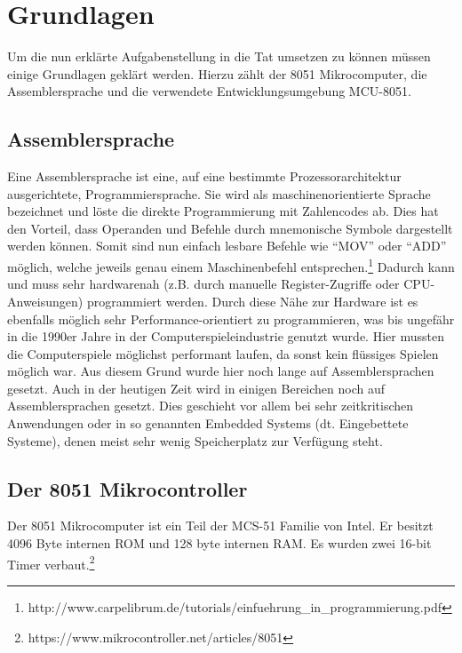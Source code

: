 \documentclass[11pt,ngerman]{report}
\begin{document}
\chapter{Grundlagen}

Um die nun erklärte Aufgabenstellung in die Tat umsetzen zu können müssen einige Grundlagen geklärt werden. Hierzu zählt der 8051 Mikrocomputer, die Assemblersprache und die verwendete Entwicklungsumgebung MCU-8051.

\section{Assemblersprache}

Eine Assemblersprache ist eine, auf eine bestimmte Prozessorarchitektur ausgerichtete, Programmiersprache. Sie wird als maschinenorientierte Sprache bezeichnet und löste die direkte Programmierung mit Zahlencodes ab. Dies hat den Vorteil, dass Operanden und Befehle durch mnemonische Symbole dargestellt werden können. Somit sind nun einfach lesbare Befehle wie “MOV” oder “ADD” möglich, welche jeweils genau einem Maschinenbefehl entsprechen.\footnote{http://www.carpelibrum.de/tutorials/einfuehrung\_in\_programmierung.pdf}
Dadurch kann und muss sehr hardwarenah (z.B. durch manuelle Register-Zugriffe oder CPU-Anweisungen) programmiert werden. Durch diese Nähe zur Hardware ist es ebenfalls möglich sehr Performance-orientiert zu programmieren, was bis ungefähr in die 1990er Jahre in der Computerspieleindustrie genutzt wurde. Hier mussten die Computerspiele möglichst performant laufen, da sonst kein flüssiges Spielen möglich war. Aus diesem Grund wurde hier noch lange auf Assemblersprachen gesetzt.
Auch in der heutigen Zeit wird in einigen Bereichen noch auf Assemblersprachen gesetzt. Dies geschieht vor allem bei sehr zeitkritischen Anwendungen oder in so genannten Embedded Systems (dt. Eingebettete Systeme), denen meist sehr wenig Speicherplatz zur Verfügung steht.

\section{Der 8051 Mikrocontroller}

Der 8051 Mikrocomputer ist ein Teil der MCS-51 Familie von Intel. Er besitzt 4096 Byte internen ROM und 128 byte internen RAM. Es wurden zwei 16-bit Timer verbaut.\footnote{https://www.mikrocontroller.net/articles/8051}
\end{document}
